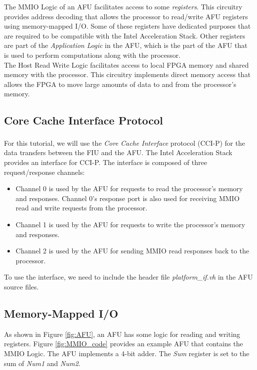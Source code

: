 \documentclass[11pt, twoside, pdftex]{article}
\begin{document}
\noindent 
The MMIO Logic of an AFU facilitates access to some {\it registers}. This circuitry provides address decoding that allows the processor to read/write AFU registers using memory-mapped I/O. Some of these registers have dedicated purposes that are required to be compatible with the Intel Acceleration Stack. Other registers are part of the {\it Application Logic} in the AFU, which is the part of the AFU that is used to perform computations along with the processor.\\

The Host Read Write Logic facilitates access to local FPGA memory and shared memory with the processor. This circuitry implements direct memory access that allows the FPGA to move large amounts of data to and from the processor's memory.


\subsection{Core Cache Interface Protocol}
For this tutorial, we will use the {\it Core Cache Interface} protocol\textsuperscript{\textregistered} (CCI-P) for the data transfers between the FIU and the AFU. The Intel Acceleration Stack provides an interface for CCI-P. The interface is composed of three request/response channels:
\begin{itemize}
    \item Channel 0 is used by the AFU for requests to read the processor's memory and responses. Channel 0’s response port is also used for receiving MMIO read and write requests from the processor.
    \item Channel 1 is used by the AFU for requests to write the processor's memory and responses.
    \item Channel 2 is used by the AFU for sending MMIO read responses back to the processor.
\end{itemize}
\noindent
To use the interface, we need to include the header file {\it platform\_if.vh} in the AFU source files. 


\subsection{Memory-Mapped I/O}
As shown in Figure \ref{fig:AFU}, an AFU has some logic for reading and writing registers. Figure \ref{fig:MMIO_code} provides an example AFU that contains the MMIO Logic. The AFU implements a 4-bit adder. The {\it Sum} register is set to the sum of {\it Num1} and {\it Num2}.\\
\end{document}
